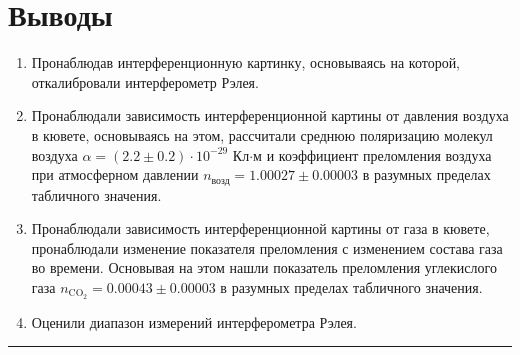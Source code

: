\documentclass[a4paper,12pt]{article} %
\begin{document}
\section{Выводы}

\begin{enumerate}
\item Пронаблюдав интерференционную картинку, основываясь на которой, откалибровали интерферометр Рэлея.
\item Пронаблюдали зависимость интерференционной картины от давления воздуха в кювете, основываясь на этом, рассчитали среднюю поляризацию молекул воздуха $\alpha = (2.2 \pm 0.2) \cdot 10^{-29}$ Кл$\cdot$м и коэффициент преломления воздуха при атмосферном давлении $n_\text{возд} = 1.00027 \pm 0.00003$ в разумных пределах табличного значения.
\item Пронаблюдали зависимость интерференционной картины от газа в кювете, пронаблюдали изменение показателя преломления с изменением состава газа во времени. Основывая на этом нашли показатель преломления углекислого газа $n_{\text{CO}_2} = 0.00043 \pm 0.00003$ в разумных пределах табличного значения.
\item Оценили диапазон измерений интерферометра Рэлея.
\end{enumerate}


\medskip\hrule\medskip
\end{document}
